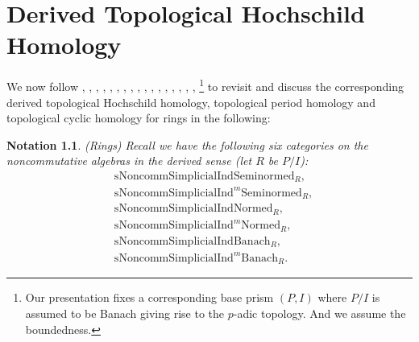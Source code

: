 \documentclass[12pt]{book}
\newtheorem{notation}{Notation}
\begin{document}
\chapter{Derived Topological Hochschild Homology}


We now follow \cite{Grot1}, \cite{Grot2}, \cite{Grot3}, \cite{Grot4}, \cite{BK}, \cite{BBK}, \cite{BBBK}, \cite{BBM}, \cite{KKM}, \cite{T2}, \cite{Sch2}, \cite{BS}, \cite{BL}, \cite{Dr1}, \cite{NS}, \cite{BMS}, \cite{B}, \cite{BHM}\footnote{Our presentation fixes a corresponding base prism $(P,I)$ where $P/I$ is assumed to be Banach giving rise to the $p$-adic topology. And we assume the boundedness. } to revisit and discuss the corresponding derived topological Hochschild homology, topological period homology and topological cyclic homology for rings in the following:

\begin{notation}\mbox{\rm{(Rings)}}
Recall we have the following six categories on the noncommutative algebras in the derived sense (let $R$ be $P/I$):
\begin{align}
&\mathrm{sNoncomm}\mathrm{Simplicial}\mathrm{Ind}\mathrm{Seminormed}_R,\\
&\mathrm{sNoncomm}\mathrm{Simplicial}\mathrm{Ind}^m\mathrm{Seminormed}_R,\\
&\mathrm{sNoncomm}\mathrm{Simplicial}\mathrm{Ind}\mathrm{Normed}_R,\\
&\mathrm{sNoncomm}\mathrm{Simplicial}\mathrm{Ind}^m\mathrm{Normed}_R,\\
&\mathrm{sNoncomm}\mathrm{Simplicial}\mathrm{Ind}\mathrm{Banach}_R,\\
&\mathrm{sNoncomm}\mathrm{Simplicial}\mathrm{Ind}^m\mathrm{Banach}_R.	
\end{align}
	
\end{notation}
\end{document}
